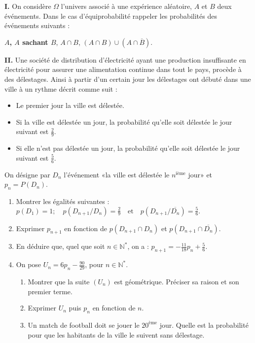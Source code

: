 \documentclass[12pt,a4paper]{article}
\begin{document}
\textbf{I.} On considère $\Omega$ l'univers associé à une expérience aléatoire, $A$ et $B$ deux événements. Dans le cas d’équiprobabilité rappeler les probabilités des événements suivants :

\textbf{$A$, $A$ sachant $B$}, $A \cap B$, $(A \cap B) \cup (A \cap \overline{B})$.

\textbf{II.} Une société de distribution d’électricité ayant une production insuffisante en électricité pour assurer une alimentation continue dans tout le pays, procède à des délestages. Ainsi à partir d’un certain jour les délestages ont débuté dans une ville à un rythme décrit comme suit :
\begin{itemize}
    \item Le premier jour la ville est délestée.
    \item Si la ville est délestée un jour, la probabilité qu’elle soit délestée le jour suivant est $\frac{2}{9}$.
    \item Si elle n’est pas délestée un jour, la probabilité qu’elle soit délestée le jour suivant est $\frac{5}{6}$.
\end{itemize}
On désigne par $D_n$ l’événement «la ville est délestée le $n^{\text{ième}}$ jour» et $p_n = P(D_n)$.

\begin{enumerate}
    \item Montrer les égalités suivantes :
          $    p(D_1) = 1 ; \quad p(D_{n+1} / D_n) = \frac{2}{9} \quad \text{et} \quad p(D_{n+1} / \overline{D_n}) = \frac{5}{6}.$
    \item Exprimer $p_{n+1}$ en fonction de $p(D_{n+1} \cap D_n)$ et $p(D_{n+1} \cap \overline{D_n})$.
    \item En déduire que, quel que soit $n \in \mathbb{N}^*$, on a :
          $p_{n+1} = -\frac{11}{18} p_n + \frac{5}{6}.$
    \item On pose $U_n = 6p_n - \frac{90}{29}$, pour $n \in \mathbb{N}^*$.
          \begin{enumerate}
              \item Montrer que la suite $(U_n)$ est géométrique. Préciser sa raison et son premier terme.
              \item Exprimer $U_n$ puis $p_n$ en fonction de $n$.
              \item Un match de football doit se jouer le $20^{\text{ème}}$ jour. Quelle est la probabilité pour que les habitants de la ville le suivent sans délestage.
          \end{enumerate}
\end{enumerate}
\end{document}
